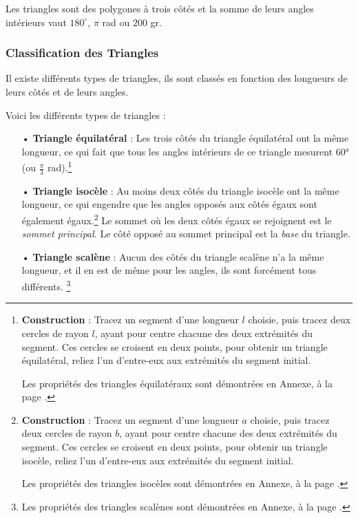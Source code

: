 \documentclass[a4paper, twoside]{article}
\begin{document}
Les triangles sont des polygones à trois côtés et la somme de leurs angles
intérieurs vaut $180^\circ$, $\pi$ rad ou $200$ gr.

\subsubsection{Classification des Triangles}

Il existe différents types de triangles,
ils sont classés en fonction des longueurs de leurs côtés et de leurs angles.

\medbreak

Voici les différents types de triangles :

\medbreak

\begin{itemize}
	\item[•] \textbf{Triangle équilatéral} :
	      Les trois côtés du triangle équilatéral ont la même longueur,
	      ce qui fait que tous les angles intérieurs de ce triangle mesurent 60°
	      (ou $\frac{\pi}{3}$ rad).\footnote{
		      \textbf{Construction} : Tracez un segment d'une longueur $l$ choisie,
		      puis tracez deux cercles de rayon $l$, ayant pour centre chacune des deux extrémités du segment.
		      Ces cercles se croisent en deux points,
		      pour obtenir un triangle équilatéral,
		      reliez l'un d'entre-eux aux extrémités du segment initial.

		      Les propriétés des triangles équilatéraux sont démontrées en Annexe, à la page \pageref{propriete_triangle_equilateral}.
			  \smallbreak
	      }
		  \medbreak
	\item[•] \textbf{Triangle isocèle} : Au moins deux côtés du triangle isocèle ont la même longueur,
	      ce qui engendre que les angles opposés aux côtés égaux sont également égaux.\footnote{
		      \textbf{Construction} : Tracez un segment d'une longueur $a$ choisie,
		      puis tracez deux cercles de rayon $b$, ayant pour centre chacune des deux extrémités du segment.
		      Ces cercles se croisent en deux points,
		      pour obtenir un triangle isocèle,
		      reliez l'un d'entre-eux aux extrémités du segment initial.

			  Les propriétés des triangles isocèles sont démontrées en Annexe, à la page \pageref{propriete_triangle_isocele}.
		      \smallbreak
		  } Le sommet où les deux côtés égaux se rejoignent est le \emph{sommet principal}.
		  Le côté opposé au sommet principal est la \emph{base} du triangle.
		  \medbreak
	\item[•] \textbf{Triangle scalène} : Aucun des côtés du triangle scalène n'a la même longueur,
	      et il en est de même pour les angles, ils sont forcément tous différents. \footnote{
		  	 Les propriétés des triangles scalènes sont démontrées en Annexe, à la page \pageref{propriete_triangle_scalene}.
	      }


\end{itemize}
\end{document}
